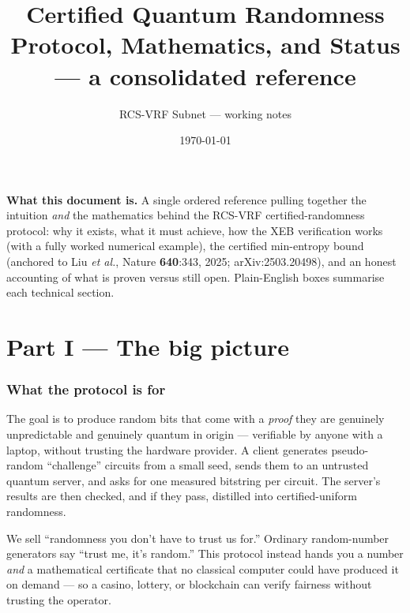 \documentclass[11pt]{article}
\title{\vspace{-1.5em}\textbf{Certified Quantum Randomness}\\[0.3em]
\large Protocol, Mathematics, and Status --- a consolidated reference}
\author{RCS-VRF Subnet --- working notes}
\date{\today}
\theoremstyle{definition}
\theoremstyle{plain}
\begin{document}
\maketitle
\vspace{-1em}

\begin{keybox}
\textbf{What this document is.} A single ordered reference pulling together the
intuition \emph{and} the mathematics behind the RCS-VRF certified-randomness protocol:
why it exists, what it must achieve, how the XEB verification works (with a fully
worked numerical example), the certified min-entropy bound (anchored to Liu \emph{et al.},
Nature \textbf{640}:343, 2025; arXiv:2503.20498), and an honest accounting of what is
proven versus still open. Plain-English boxes summarise each technical section.
\end{keybox}

\tableofcontents
\bigskip

\part*{Part I --- The big picture}

\section{What the protocol is for}
The goal is to produce random bits that come with a \emph{proof} they are genuinely
unpredictable and genuinely quantum in origin --- verifiable by anyone with a laptop,
without trusting the hardware provider. A client generates pseudo-random ``challenge''
circuits from a small seed, sends them to an untrusted quantum server, and asks for one
measured bitstring per circuit. The server's results are then checked, and if they pass,
distilled into certified-uniform randomness.

\begin{plain}
We sell ``randomness you don't have to trust us for.'' Ordinary random-number generators
say ``trust me, it's random.'' This protocol instead hands you a number \emph{and} a
mathematical certificate that no classical computer could have produced it on demand --- so
a casino, lottery, or blockchain can verify fairness without trusting the operator.
\end{plain}
\end{document}
